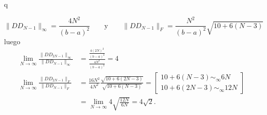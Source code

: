 q\documentclass[12pt]{article}
\newcommand{\norm}[1]{\lVert #1\rVert}
\theoremstyle{definition}
\begin{document}
$$\norm{DD_{N-1}}_\infty = \frac{4 N^2}{(b - a)^2}\quad \quad \text{y} \quad \quad \norm{DD_{N-1}}_F = \frac{N^2}{(b-a)^2}\sqrt{10 + 6(N - 3)}$$
luego
\begin{align*}
	\lim_{N\to\infty}\frac{\norm{DD_{2N-1}}_\infty}{\norm{DD_{N-1}}_\infty} &= \frac{\frac{4 (2 N)^2}{(b-a)^2}}{\frac{4 N^2}{(b-a)^2}} = 4 \\
	\lim_{N\to\infty}\frac{\norm{DD_{2N-1}}_F}{\norm{DD_{N-1}}_F} &= \frac{16 N^2}{4N^2}\frac{\sqrt{10 + 6(2N - 3)}}{\sqrt{10 + 6(N - 3)}} = \left[\begin{matrix}
		10 + 6(N - 3) \sim_\infty 6N \\
		10 + 6(2N - 3) \sim_\infty 12N
	\end{matrix}\right]  \\
	&= \lim_{N\to\infty} 4 \sqrt{\frac{12 N }{6 N}} = 4 \sqrt{2}.
\end{align*}
\end{document}
